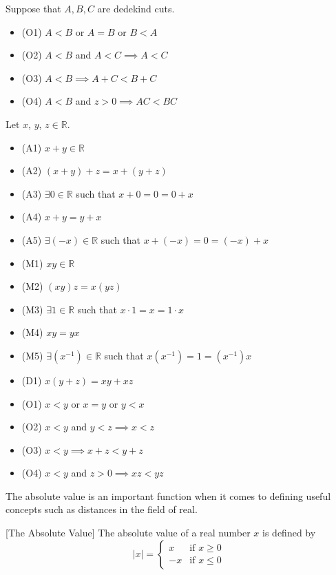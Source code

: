 \documentclass[a4paper]{article}
\begin{document}
\begin{prp}{}{} Suppose that $A,B,C$ are dedekind cuts. 
\begin{itemize}
\item (O1) $A<B$ or $A=B$ or $B<A$
\item (O2) $A<B$ and $A<C\implies A<C$
\item (O3) $A<B\implies A+C<B+C$
\item (O4) $A<B$ and $z>0\implies AC<BC$
\end{itemize}
\end{prp}

\begin{prp}{}{} Let $x$, $y$, $z\in\mathbb{R}$. 
\begin{itemize}
\item (A1) $x+y\in\mathbb{R}$
\item (A2) $(x+y)+z=x+(y+z)$
\item (A3) $\exists 0\in\mathbb{R}$ such that $x+0=0=0+x$
\item (A4) $x+y=y+x$
\item (A5) $\exists(-x)\in\mathbb{R}$ such that $x+(-x)=0=(-x)+x$
\item (M1) $xy\in\mathbb{R}$
\item (M2) $(xy)z=x(yz)$
\item (M3) $\exists 1\in\mathbb{R}$ such that $x\cdot1=x=1\cdot x$
\item (M4) $xy=yx$
\item (M5) $\exists (x^{-1})\in\mathbb{R}$ such that $x(x^{-1})=1=(x^{-1})x$
\item (D1) $x(y+z)=xy+xz$
\item (O1) $x<y$ or $x=y$ or $y<x$
\item (O2) $x<y$ and $y<z\implies x<z$
\item (O3) $x<y\implies x+z<y+z$
\item (O4) $x<y$ and $z>0\implies xz<yz$
\end{itemize}
\end{prp}

The absolute value is an important function when it comes to defining useful concepts such as distances in the field of real. 

\begin{defn}{}{}[The Absolute Value] The absolute value of a real number $x$ is defined by
$$|x|=\begin{cases}
x & \text{if $x\geq0$} \\
-x & \text{if $x\leq0$}
\end{cases}$$
\end{defn}
\end{document}
